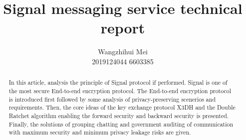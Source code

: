 \documentclass[11pt,en]{elegantpaper}
\title{Signal messaging service technical report}
\author{Wangzhihui Mei \\ 2019124044 6603385}
\institute{CCNU-UOW JI}
\date{}
\begin{document}
\maketitle

\begin{abstract}

    In this article, analysis the principle of Signal protocol if performed. Signal is one of the most secure End-to-end encryption protocol. The End-to-end encryption protocol is introduced first followed by some analysis of privacy-preserving scenerios and requirements. Then, the core ideas of the key exchange protocol X3DH and the Double Ratchet algorithm enabling the forward security and backward security is presented. Finally, the solutions of grouping chatting and government auditing of communication with maximum security and minimum privacy leakage risks are given. 


\end{abstract}

\end{document}
